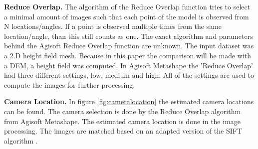 \documentclass{isprs} %
\begin{document}
\textbf{Reduce Overlap.} 
The algorithm of the Reduce Overlap function tries to select a minimal amount of images such that each point of the model is observed from N locations/angles.
If a point is observed multiple times from the same location/angle, than this still counts as one. 
The exact algorithm and parameters behind the Agisoft Reduce Overlap function are unknown.
The input dataset was a 2.D height field mesh. 
Because in this paper the comparison will be made with a DEM, a height field was computed.
In Agisoft Metashape the 'Reduce Overlap' had three different settings, low, medium and high. 
All of the settings are used to compute the images for further processing.

\textbf{Camera Location.}
In figure \ref{fig:cameralocation} the estimated camera locations can be found. The camera selection is done by the Reduce Overlap algorithm from Agisoft Metashape. The estimated camera location is done in the image processing.
The images are matched based on an adapted version of the SIFT algorithm \citep{lowe1999object, AgisoftMetashape}. 
\end{document}
